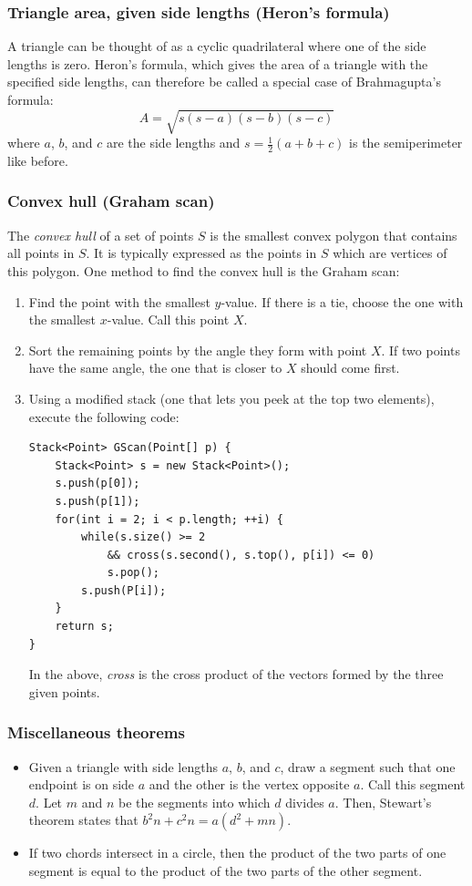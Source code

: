 \documentclass[a4paper,12pt]{article}
\begin{document}
\subsubsection{Triangle area, given side lengths (Heron's formula)}
A triangle can be thought of as a cyclic quadrilateral where one of the side lengths is zero. Heron's formula, which gives the area of a triangle with the specified side lengths, can therefore be called a special case of Brahmagupta's formula:
\[A=\sqrt{s(s-a)(s-b)(s-c)}\]
\noindent where $a$, $b$, and $c$ are the side lengths and $s=\frac{1}{2}\left(a+b+c\right)$ is the semiperimeter like before.

\subsubsection{Convex hull (Graham scan)}
The {\em convex hull} of a set of points $S$ is the smallest convex polygon that contains all points in $S$. It is typically expressed as the points in $S$ which are vertices of this polygon. One method to find the convex hull is the Graham scan:

\begin{enumerate}
\item Find the point with the smallest $y$-value. If there is a tie, choose the one with the smallest $x$-value. Call this point $X$.
\item Sort the remaining points by the angle they form with point $X$. If two points have the same angle, the one that is closer to $X$ should come first.
\item Using a modified stack (one that lets you peek at the top two elements), execute the following code:
\begin{lstlisting}
Stack<Point> GScan(Point[] p) {
	Stack<Point> s = new Stack<Point>();
	s.push(p[0]);
	s.push(p[1]);
	for(int i = 2; i < p.length; ++i) {
		while(s.size() >= 2
			&& cross(s.second(), s.top(), p[i]) <= 0)
			s.pop();
		s.push(P[i]);
	}
	return s;
}
\end{lstlisting}

In the above, {\em cross} is the cross product of the vectors formed by the three given points.

\end{enumerate}

\subsubsection{Miscellaneous theorems}
\begin{itemize}
\item Given a triangle with side lengths $a$, $b$, and $c$, draw a segment such that one endpoint is on side $a$ and the other is the vertex opposite $a$. Call this segment $d$. Let $m$ and $n$ be the segments into which $d$ divides $a$. Then, Stewart's theorem states that $b^2n+c^2n = a(d^2 + mn)$.
\item If two chords intersect in a circle, then the product of the two parts of one segment is equal to the product of the two parts of the other segment.
\end{itemize}
\end{document}
